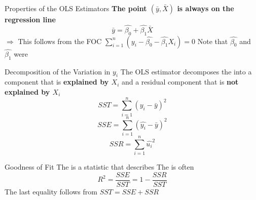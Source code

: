 \begin{frame}{Properties of the OLS Estimators}
 \textbf{The point $(\bar{y}, \bar{X})$ is always on the regression line}
\begin{equation}
\bar{y}=\widehat{\beta_0}+\widehat{\beta_1}\bar{X}
\label{eq20}
\end{equation}
$\Rightarrow$ This follows from the FOC $\displaystyle\sum_{i=1}^n (y_i-\widehat{\beta_0}-\widehat{\beta_1}X_i)=0$
\vfill
\pause
Note that  
\vfill
$\widehat{\beta_0}$ and $\widehat{\beta_1}$ were 
\end{frame}


\begin{frame}{Decomposition of the Variation in $y_i$}
The OLS estimator decomposes the  into a component that is \textbf{explained by $X_i$} and a residual component that is \textbf{not explained by $X_i$}
\vfill
{}
\begin{equation}
SST=\displaystyle\sum_{i=1}^n (y_i-\bar{y})^2
\label{eq21}
\end{equation}
\vfill
\pause
{}
\begin{equation}
SSE=\displaystyle\sum_{i=1}^n (\widehat{y_i}-\bar{y})^2
\label{eq21}
\end{equation}
\vfill
\pause
{}
\begin{equation}
SSR=\displaystyle\sum_{i=1}^n \widehat{u_i}^2
\label{eq21}
\end{equation}
\end{frame}


\begin{frame}{Goodness of Fit}
The  is a statistic that describes 
\vfill
The  is often 
\begin{equation}
R^2= \frac{SSE}{SST}=1-\frac{SSR}{SST}
\label{eq21}
\end{equation}
The last equality follows from $SST=SSE+SSR$
\end{frame}


